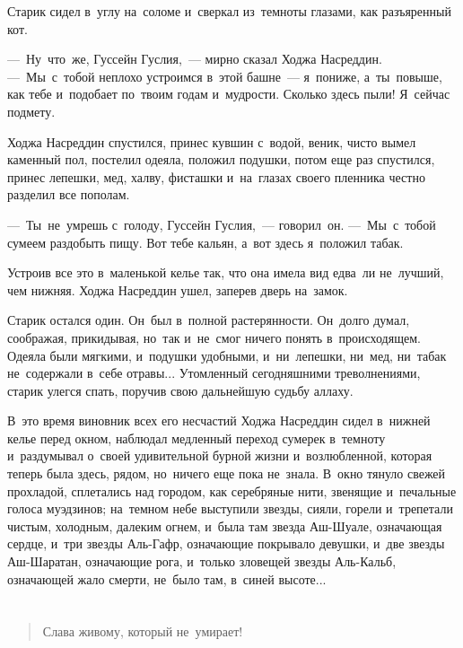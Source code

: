 \documentclass[12pt,a4paper]{book}
\begin{document}
Старик сидел в~углу на~соломе и~сверкал из~темноты глазами, как разъяренный кот.

—~Ну~что~же, Гуссейн Гуслия,~— мирно сказал Ходжа Насреддин. —~Мы~с~тобой неплохо устроимся в~этой башне~— я~пониже, а~ты~повыше, как тебе и~подобает по~твоим годам и~мудрости. Сколько здесь пыли! Я~сейчас подмету.

Ходжа Насреддин спустился, принес кувшин с~водой, веник, чисто вымел каменный пол, постелил одеяла, положил подушки, потом еще раз спустился, принес лепешки, мед, халву, фисташки и~на~глазах своего пленника честно разделил все пополам.

—~Ты~не~умрешь с~голоду, Гуссейн Гуслия,~— говорил~он. —~Мы~с~тобой сумеем раздобыть пищу. Вот тебе кальян, а~вот здесь я~положил табак.

Устроив все это в~маленькой келье так, что она имела вид едва~ли не~лучший, чем нижняя. Ходжа Насреддин ушел, заперев дверь на~замок.

Старик остался один. Он~был в~полной растерянности. Он~долго думал, соображая, прикидывая, но~так и~не~смог ничего понять в~происходящем. Одеяла были мягкими, и~подушки удобными, и~ни~лепешки, ни~мед, ни~табак не~содержали в~себе отравы... Утомленный сегодняшними треволнениями, старик улегся спать, поручив свою дальнейшую судьбу аллаху.

В~это время виновник всех его несчастий Ходжа Насреддин сидел в~нижней келье перед окном, наблюдал медленный переход сумерек в~темноту и~раздумывал о~своей удивительной бурной жизни и~возлюбленной, которая теперь была здесь, рядом, но~ничего еще пока не~знала. В~окно тянуло свежей прохладой, сплетались над городом, как серебряные нити, звенящие и~печальные голоса муэдзинов; на~темном небе выступили звезды, сияли, горели и~трепетали чистым, холодным, далеким огнем, и~была там звезда Аш-Шуале, означающая сердце, и~три звезды Аль-Гафр, означающие покрывало девушки, и~две звезды Аш-Шаратан, означающие рога, и~только зловещей звезды Аль-Кальб, означающей жало смерти, не~было там, в~синей высоте...


\part{}


\begin{quote}
Слава живому, который не~умирает!
\end{quote}

\chapter{}
\end{document}
